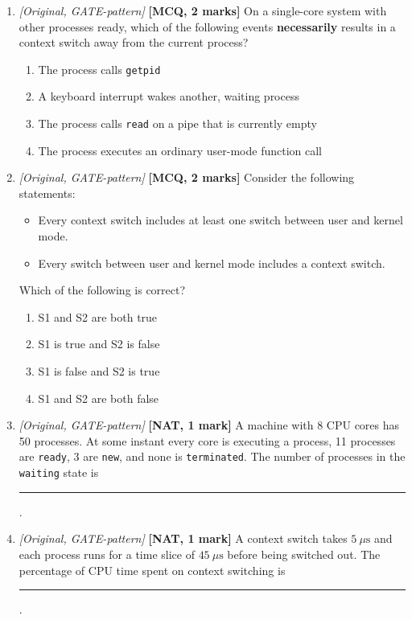 \documentclass[11pt]{article}
\begin{document}
\begin{enumerate}
\item[\textbf{Q4}] \textit{[Original, GATE-pattern]} \textbf{[MCQ, 2 marks]} On a single-core system with other processes ready, which of the following events \textbf{necessarily} results in a context switch away from the current process?

\begin{enumerate}
  \item[(A)] The process calls \texttt{getpid}
  \item[(B)] A keyboard interrupt wakes another, waiting process
  \item[(C)] The process calls \texttt{read} on a pipe that is currently empty
  \item[(D)] The process executes an ordinary user-mode function call
\end{enumerate}

\item[\textbf{Q5}] \textit{[Original, GATE-pattern]} \textbf{[MCQ, 2 marks]} Consider the following statements:
\begin{itemize}
  \item[S1:] Every context switch includes at least one switch between user and kernel mode.
  \item[S2:] Every switch between user and kernel mode includes a context switch.
\end{itemize}
Which of the following is correct?

\begin{enumerate}
  \item[(A)] S1 and S2 are both true
  \item[(B)] S1 is true and S2 is false
  \item[(C)] S1 is false and S2 is true
  \item[(D)] S1 and S2 are both false
\end{enumerate}

\item[\textbf{Q6}] \textit{[Original, GATE-pattern]} \textbf{[NAT, 1 mark]} A machine with 8 CPU cores has 50 processes. At some instant every core is executing a process, 11 processes are \texttt{ready}, 3 are \texttt{new}, and none is \texttt{terminated}. The number of processes in the \texttt{waiting} state is \rule{1.5cm}{0.4pt}.

\item[\textbf{Q7}] \textit{[Original, GATE-pattern]} \textbf{[NAT, 1 mark]} A context switch takes $5\ \mu\text{s}$ and each process runs for a time slice of $45\ \mu\text{s}$ before being switched out. The percentage of CPU time spent on context switching is \rule{1.5cm}{0.4pt}.


\end{enumerate}
\end{document}
